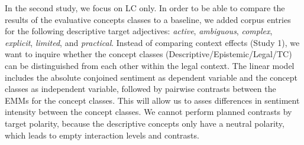 \documentclass{article}
\begin{document}
In the second study, we focus on LC only. In order to be able to compare the results of the evaluative concepts classes to a baseline, we added corpus entries for the following descriptive target adjectives: \textit{active}, \textit{ambiguous}, \textit{complex}, \textit{explicit}, \textit{limited}, and \textit{practical}. Instead of comparing context effects (Study 1), we want to inquire whether the concept classes (Descriptive/Epistemic/Legal/TC) can be distinguished from each other within the legal context. The linear model includes the absolute conjoined sentiment as dependent variable and the concept classes as independent variable, followed by pairwise contrasts between the EMMs for the concept classes. This will allow us to asses differences in sentiment intensity between the concept classes. 
We cannot perform planned contrasts by target polarity, because the descriptive concepts only have a neutral polarity, which leads to empty interaction levels and contrasts. %


\end{document}
